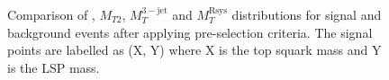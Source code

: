 \begin{figure}[!t]
  \centering
{}
  \caption{Comparison of \met, $M_{T2}$, $M_{T}^\mathrm{3-jet}$ and $M_{T}^\mathrm{Rsys}$ distributions for signal and background events after applying pre-selection criteria. The signal points are labelled as (X, Y) where X is the top squark mass and Y is the LSP mass.}
  \label{fig:stop_ref_plots}
\end{figure} 
